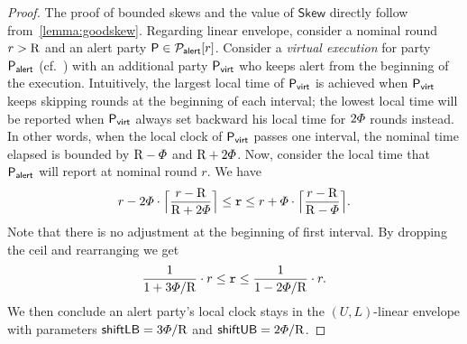\begin{proof}
    The proof of bounded skews and the value of $\mathsf{Skew}$ directly follow from~\cref{lemma:goodskew}.
    Regarding linear envelope, consider a nominal round $r > \mathrm{R}$ and an alert party $\mathsf{P} \in \mathcal{P}_{\mathsf{alert}}[r]$.
    Consider a \emph{virtual execution} for party $\mathsf{P}_{\mathsf{alert}}$ (cf.~\cite{CCS:BGKRZ18}) with an additional party $\mathsf{P}_{\mathsf{virt}}$ who keeps alert from the beginning of the execution.
    Intuitively, the largest local time of $\mathsf{P}_{\mathsf{virt}}$ is achieved when $\mathsf{P}_{\mathsf{virt}}$ keeps skipping \maxskew rounds at the beginning of each interval; the lowest local time will be reported when $\mathsf{P}_{\mathsf{virt}}$ always set backward his local time for $2\varPhi$ rounds instead.
    In other words, when the local clock of $\mathsf{P}_{\mathsf{virt}}$ passes one interval, the nominal time elapsed is bounded by $\mathrm{R} - \varPhi$ and $\mathrm{R} + 2\varPhi$.
    Now, consider the local time \round that $\mathsf{P}_{\mathsf{alert}}$ will report at nominal round $r$.
    We have
    \[ r - 2\varPhi \cdot \Big\lceil \frac{r - \mathrm{R}}{\mathrm{R} + 2\varPhi} \Big\rceil \le \mathtt{r} \le r + \varPhi \cdot \Big\lceil \frac{r - \mathrm{R}}{\mathrm{R} - \varPhi} \Big\rceil. \]
    Note that there is no adjustment at the beginning of first interval.
    By dropping the ceil and rearranging we get
    \[ \frac{1}{1 + 3\varPhi / \mathrm{R}} \cdot r \le \mathtt{r} \le  \frac{1}{1 - 2\varPhi / \mathrm{R}} \cdot r. \]
    We then conclude an alert party's local clock stays in the $(U, L)$-linear envelope with parameters $\mathsf{shiftLB} = 3\varPhi / \mathrm{R}$ and $\mathsf{shiftUB} = 2\varPhi / \mathrm{R}$.
\end{proof}
